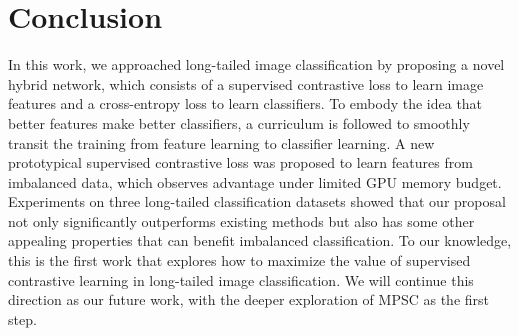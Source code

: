 \documentclass[final]{cvpr}
\begin{document}
\vspace*{-0.2cm}


\section{Conclusion} 

In this work, we approached long-tailed image classification by proposing a novel hybrid network, which consists of a supervised contrastive loss to learn image features and a cross-entropy loss to learn classifiers. To embody the idea that better features make better classifiers, a curriculum is followed to smoothly transit the training from feature learning to classifier learning. A new prototypical supervised contrastive loss was proposed to learn features from imbalanced data, which observes advantage under limited GPU memory budget.
Experiments on three long-tailed classification datasets showed that our proposal not only significantly outperforms existing methods but also has some other appealing properties that can benefit imbalanced classification. 
To our knowledge, this is the first work that explores how to maximize the value of supervised contrastive learning in long-tailed image classification. We will continue this direction as our future work, with the deeper exploration of MPSC as the first step. 







{\small


}
\end{document}
